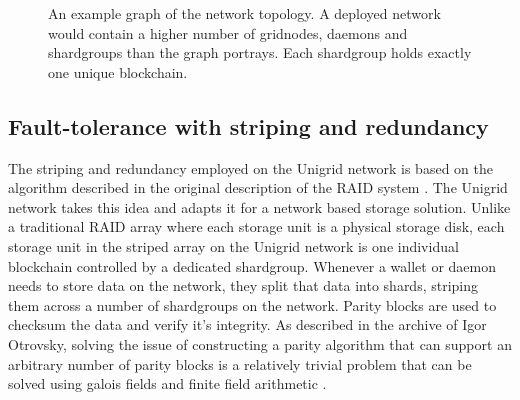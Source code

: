 \documentclass[10pt,a4paper,final]{article}
\begin{document}
\begin{figure}[H]
\centering
{}
\caption{An example graph of the network topology. A deployed network would contain a higher number of \glspl{gridnode}, daemons and \glspl{shardgroup} than the graph portrays. Each \gls{shardgroup} holds exactly one unique blockchain.}
\end{figure}


\subsection{Fault-tolerance with striping and redundancy}
The striping and redundancy employed on the Unigrid network is based on the algorithm described in the original description of the RAID system \cite{patterson1988, chen1990}. The Unigrid network takes this idea and adapts it for a network based storage solution. Unlike a traditional RAID array where each storage unit is a physical storage disk, each storage unit in the striped array on the Unigrid network is one individual blockchain controlled by a dedicated \gls{shardgroup}. Whenever a wallet or daemon needs to store data on the network, they split that data into shards, striping them across a number of \glspl{shardgroup} on the network. Parity blocks are used to checksum the data and verify it's integrity. As described in the archive of Igor Otrovsky, solving the issue of constructing a parity algorithm that can support an arbitrary number of parity blocks is a relatively trivial problem that can be solved using galois fields and finite field arithmetic \cite{igorparity2014} \cite{finitefield2021}.
\end{document}
